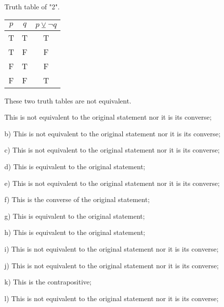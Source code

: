 \documentclass{article}
\begin{document}
  Truth table of "2".

  {
  \setlength{\tabcolsep}{10pt} %
  \renewcommand{\arraystretch}{1.5} %
  \begin{tabular}{|c|c|c|}
    \hline
    $p$ & $q$ & $p \veebar \neg q$ \\
    \hline
    T & T & T \\
    T & F & F \\
    F & T & F \\
    F & F & T \\
    \hline
  \end{tabular}
  }

  These two truth tables are not equivalent.


  This is not equivalent to the original statement nor it is its converse;

  b) This is not equivalent to the original statement nor it is its converse;

  c) This is not equivalent to the original statement nor it is its converse;

  d) This is equivalent to the original statement;

  e) This is not equivalent to the original statement nor it is its converse;

  f) This is the converse of the original statement;

  g) This is equivalent to the original statement;

  h)  This is equivalent to the original statement;

  i) This is not equivalent to the original statement nor it is its converse;

  j) This is not equivalent to the original statement nor it is its converse;

  k) This is the contrapositive;

  l) This is not equivalent to the original statement nor it is its converse;
\end{document}
